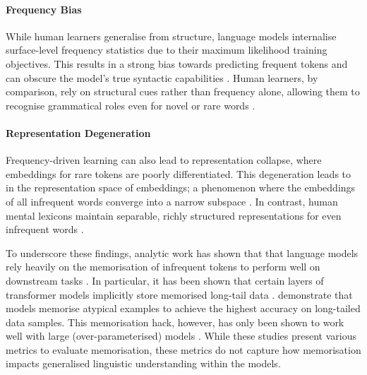 \paragraph{Frequency Bias} While human learners generalise from structure, language models internalise surface-level frequency statistics due to their maximum likelihood training objectives. This results in a strong bias towards predicting frequent tokens and can obscure the model's true syntactic capabilities \citep{feldman2020does, haviv2023understanding}. Human learners, by comparison, rely on structural cues rather than frequency alone, allowing them to recognise grammatical roles even for novel or rare words \citep{tomasello2003constructing, clark2020emergence}.

\paragraph{Representation Degeneration} Frequency-driven learning can also lead to representation collapse, where embeddings for rare tokens are poorly differentiated. This degeneration leads to  in the representation space of embeddings; a phenomenon where the embeddings of all infrequent words converge into a narrow subspace \citep{ethayarajh2019contextual}. In contrast, human mental lexicons maintain separable, richly structured representations for even infrequent words \citep{murphy2002bigbook}.

To underscore these findings, analytic work has shown that that language models rely heavily on the memorisation of infrequent tokens to perform well on downstream tasks \citep{feldman2020does}. In particular, it has been shown that certain layers of transformer models implicitly store memorised long-tail data \citep{haviv2023understanding, kobayashi2023transformer}. \citet{feldman2020neural} demonstrate that models memorise atypical examples to achieve the highest accuracy on long-tailed data samples. This memorisation hack, however, has only been shown to work well with large (over-parameterised) models \citep{belkin2019reconciling}. While these studies present various metrics to evaluate memorisation, these metrics do not capture how memorisation impacts generalised linguistic understanding within the models.  %

